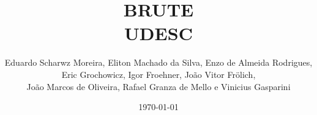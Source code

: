 \documentclass[11pt, a4paper, oneside]{book}
\title{BRUTE \\ UDESC}
\author{Eduardo Scharwz Moreira, Eliton Machado da Silva, Enzo de Almeida Rodrigues,\\
Eric Grochowicz, Igor Froehner, João Vitor Frölich,\\
João Marcos de Oliveira, Rafael Granza de Mello e Vinicius Gasparini}
\begin{document}
\twocolumn
\date{\today}
\maketitle

\renewcommand{\contentsname}{Índice} %

\tableofcontents
\end{document}
